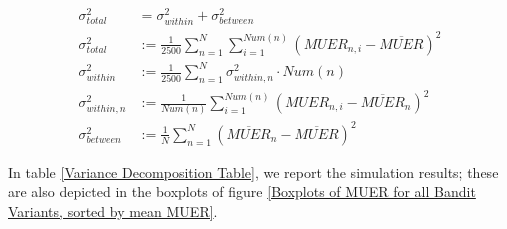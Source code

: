 \begin{align}
\sigma^2_{total} &= \sigma^2_{within} + \sigma^2_{between} \\
\sigma^2_{total} &:= \frac{1}{2500} \sum_{n=1}^N \sum_{i=1}^{Num(n)} \left(MUER_{n,i} - \overline{MUER}\right)^2 \\
\sigma^2_{within} &:= \frac{1}{2500} \sum_{n=1}^{N} \sigma^2_{within,n} \cdot Num(n) \\
\sigma^2_{within,n} &:= \frac{1}{Num(n)} \sum_{i=1}^{Num(n)} \left(MUER_{n,i} - \overline{MUER}_{n}\right)^2 \\
\sigma^2_{between} &:=  \frac{1}{N} \sum_{n=1}^{N} \left(\overline{MUER}_{n} - \overline{MUER} \right)^2
\end{align}

In table \ref{Variance Decomposition Table}, we report the simulation results; these are also depicted in the boxplots of figure \ref{Boxplots of MUER for all Bandit Variants, sorted by mean MUER}.

